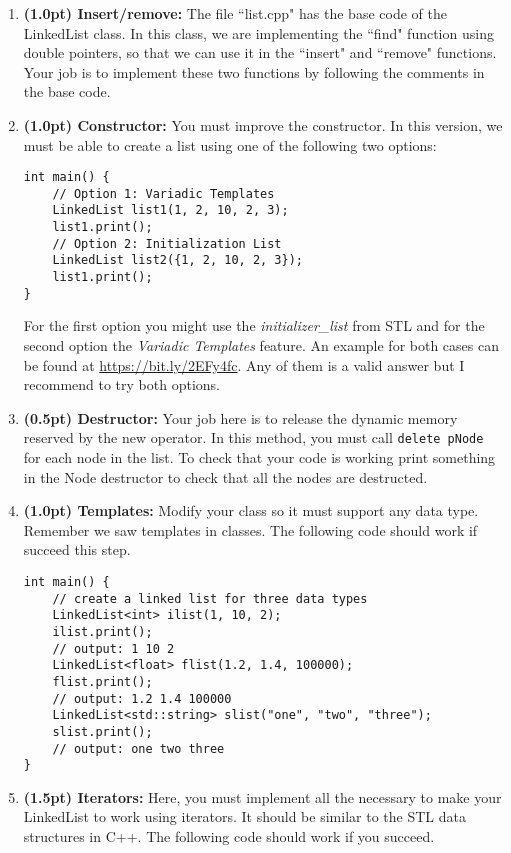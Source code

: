 \documentclass{article}
\begin{document}
\begin{enumerate}[label=\Alph*]
  \item \textbf{(1.0pt) Insert/remove:} The file ``list.cpp" has the base code of the LinkedList class. In this class, we are implementing the ``find" function using double pointers, so that we can use it in the ``insert" and ``remove" functions. Your job is to implement these two functions by following the comments in the base code.
  
  
  \item \textbf{(1.0pt) Constructor:} You must improve the constructor. In this version, we must be able to create a list using one of the following two options:
  
\begin{lstlisting}
int main() {
    // Option 1: Variadic Templates
    LinkedList list1(1, 2, 10, 2, 3);
    list1.print();
    // Option 2: Initialization List
    LinkedList list2({1, 2, 10, 2, 3});
    list1.print();
}
\end{lstlisting}

 For the first option you might use the \emph{initializer\_list} from STL and for the second option the \emph{Variadic Templates} feature. An example for both cases can be found at \url{https://bit.ly/2EFy4fc}. Any of them is a valid answer but I recommend to try both options. 
  
  \item \textbf{(0.5pt) Destructor:} Your job here is to release the dynamic memory reserved by the new operator. In this method, you must call \lstinline|delete pNode| for each node in the list. To check that your code is working print something in the Node destructor to check that all the nodes are destructed.
  
  \item \textbf{(1.0pt) Templates:} Modify your class so it must support any data type. Remember we saw templates in classes. The following code should work if succeed this step.
  
\begin{lstlisting}
int main() {
    // create a linked list for three data types
    LinkedList<int> ilist(1, 10, 2);
    ilist.print();
    // output: 1 10 2 
    LinkedList<float> flist(1.2, 1.4, 100000);
    flist.print();
    // output: 1.2 1.4 100000 
    LinkedList<std::string> slist("one", "two", "three");
    slist.print();
    // output: one two three 
}
\end{lstlisting}
  
  \item \textbf{(1.5pt) Iterators:} Here, you must implement all the necessary to make your LinkedList to work using iterators. It should be similar to the STL data structures in C++. The following code should work if you succeed.
  

\end{enumerate}
\end{document}
